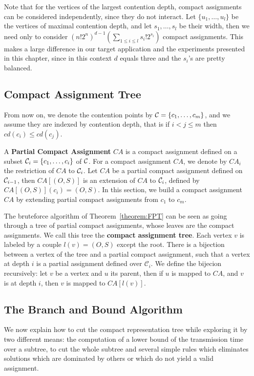 Note that for the vertices of the largest contention depth, compact assignments can be considered independently, since
they do not interact. Let $\{u_1,\dots,u_l\}$ be the vertices of maximal contention depth, and let $s_1,\dots,s_l$
be their width, then we need only to consider $(n!2^{n})^{d-1}(\sum_{1 \leq i\leq l} s_{i}!2^{s_i})$ compact assignments. This makes a large difference in our target application and the experiments presented in this chapter, since in this context $d$ equals three and the $s_i$'s are pretty balanced.

\subsection{Compact Assignment Tree}

From now on, we denote the contention points by ${\cal C} = \{c_1,\dots, c_m\}$,
and we assume they are indexed by contention depth, that is  if $i < j \leq m$ then  $cd(c_i) \leq cd(c_j)$. 

A \textbf{Partial Compact Assignment} $CA$ is a compact assignment defined on a subset ${\cal C}_i = \{c_1,\ldots,c_i\}$ of ${\cal C}$. For a compact assignment $CA$, we denote by $CA_i$ the restriction of $CA$ to ${\cal C}_i$.
Let $CA$ be a partial compact assignment defined on ${\cal C}_{i-1}$, then $CA[(O,S)]$ is an extension of $CA$ to ${\cal C}_{i}$, defined by $CA[(O,S)](c_i) = (O,S)$.  In this section, we build a compact assignment $CA$ by extending partial compact assignments from $c_1$ to $c_m$.


The bruteforce algorithm of Theorem~\ref{theorem:FPT} can be seen as going through a tree of partial compact assignments,
whose leaves are the compact assignments. We call this tree the \textbf{compact assignment tree}. Each vertex $v$ is labeled by a couple $l(v) = (O,S)$ except the root. There is a bijection between a vertex of the tree and a partial compact assignment, such that a vertex at depth $i$ is a partial assignment defined over $\mathcal{C}_i$.
We define the bijecion recursively: let $v$ be a vertex and $u$ its parent, then if $u$ is mapped to $CA$,
and $v$ is at depth $i$, then $v$ is mapped to $CA[l(v)]$.



\subsection{The Branch and Bound Algorithm}


We now explain how to cut the compact representation tree while exploring it by two different means:
the computation of a lower bound of the transmission time over a subtree, to cut the whole subtree and 
several simple rules which eliminates solutions which are dominated by others or which do not yield a valid assignment.


